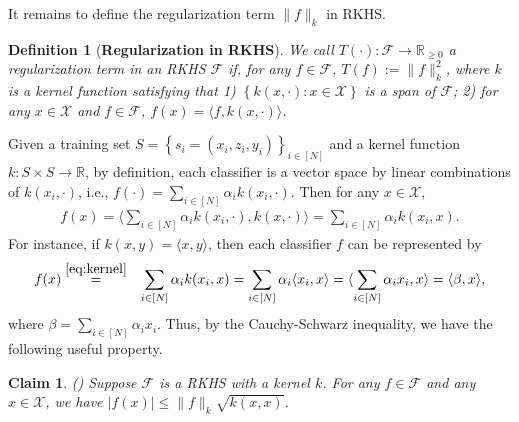 \documentclass[11pt]{article}
\newtheorem{definition}[theorem]{Definition}
\newtheorem{claim}[theorem]{Claim}
\newcommand{\R}{\mathbb{R}}
\newcommand{\calF}{\mathcal{F}}
\newcommand{\calX}{\mathcal{X}}
\begin{document}
	\noindent
	It remains to define the regularization term $\|f\|_k$ in RKHS.
	
	\begin{definition}[\textbf{Regularization in RKHS}]
		\label{def:RKHS}
		We call $T(\cdot): \calF\rightarrow \R_{\geq 0}$ a regularization term in an RKHS $\calF$ if, for any $f\in \calF$,
		$T(f):=\|f\|_k^2$,
		where $k$ is a kernel function satisfying that 
		1) $\left\{k(x,\cdot):x\in \calX \right\}$ is a span of $\calF$; 2) for any $x\in \calX$ and $f\in \calF$, $f(x)=\langle f,k(x,\cdot) \rangle$.
	\end{definition}
	\noindent
	Given a training set $S=\left\{s_i=\left(x_i,z_i,y_i\right)\right\}_{i\in [N]}$ and a kernel function $k: S\times S\rightarrow \R$, by definition, each classifier is a vector space by linear combinations of $k(x_i,\cdot)$, i.e.,
	$f(\cdot) = \sum_{i\in [N]} \alpha_i k(x_i,\cdot)$.
	Then for any $x\in \calX$, 
	\begin{eqnarray}
	\label{eq:kernel}
	f(x) = \langle  \sum_{i\in [N]} \alpha_i k(x_i,\cdot), k(x,\cdot) \rangle =  \sum_{i\in [N]} \alpha_i k(x_i,x).
	\end{eqnarray}
	For instance, if $k(x,y)=\langle x,y \rangle$, then each classifier $f$ can be represented by 
	\begin{eqnarray*}
		f(x) &\stackrel{\eqref{eq:kernel}}{=}& \sum_{i\in [N]} \alpha_i k(x_i,x) = \sum_{i\in [N]} \alpha_i \langle x_i,x\rangle  =\langle \sum_{i\in [N]} \alpha_i x_i,x\rangle = \langle \beta, x \rangle,
	\end{eqnarray*}
	where $\beta = \sum_{i\in [N]} \alpha_i x_i$.
	Thus, by the Cauchy-Schwarz inequality, we have the following useful property.
	
	\begin{claim} (\cite{bousquet2002stability})
		\label{cl:RKHS}
		Suppose $\calF$ is a RKHS with a kernel $k$.
		For any $f\in \calF$ and any $x\in \calX$, we have
		$|f(x)|\leq \|f\|_k \sqrt{k(x,x)}$. 
	\end{claim}
	
\end{document}
